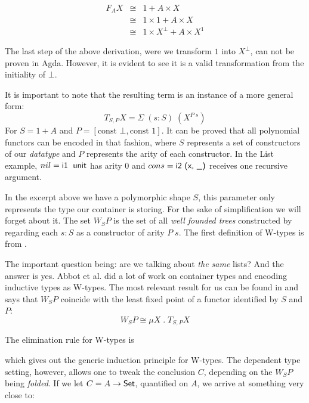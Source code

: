 \begin{eqnarray*}
  F_A X & \cong & 1 + A \times X \\
        & \cong & 1 \times 1 + A \times X \\
        & \cong & 1 \times X^\bot + A \times X^1
\end{eqnarray*}

The last step of the above derivation, were we transform $1$ into $X^\bot$, can not be proven
in Agda. However, it is evident to see it is a valid transformation from the initiality of $\bot$.

It is important to note that the resulting term is an instance of a more general form: 
\[ T_{S, P} X = \Sigma\; (s : S)\; (X^{P\; s})\] 
For $S = 1 + A$ and $P = [ \text{const }\bot , \text{const }1 ]$. It can be proved
that all polynomial functors can be encoded in that fashion\cite{Abbott04}, where $S$ represents
a set of constructors of our \emph{datatype} and $P$ represents the arity of each constructor.
In the List example, $nil = \IC{i1\; unit}$ has arity 0 and $cons = \IC{i2 (x, \_)}$ receives
one recursive argument.


In the excerpt above we have a polymorphic shape $S$, this parameter
only represents the type our container is storing. For the sake of simplification we will forget about it.
The set $W_S P$ is the set of all \emph{well founded trees} constructed by regarding each $s : S$ 
as a constructor of arity $P\; s$. The first definition of W-types is from \cite{lof84}.


The important question being: are we talking about \emph{the same} lists? And the answer 
is yes. Abbot et al. did a lot of work on container types
and encoding inductive types as W-types. The most relevant result for us can be found in \cite{Abbott04} and
says that $W_S P$ coincide with the least fixed point of a functor identified by $S$ and $P$:
\[
  W_S P \cong \mu X\; . \;T_{S , P} X
\]

The elimination rule for W-types is


which gives out the generic induction principle for W-types. The dependent type setting, however, allows
one to tweak the conclusion $C$, depending on the $W_S P$ being \emph{folded}. If we let
$C = A \rightarrow \D{Set}$, quantified on $A$, we arrive at something very close to:

